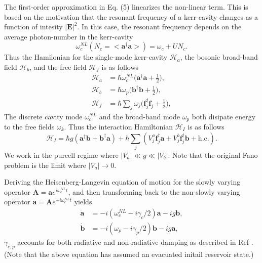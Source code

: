 \documentclass[12pt]{article}
\begin{document}
The first-order approximation in Eq. (5) linearizes the non-linear term.
This is based on the motivation that the resonant frequency of a kerr-cavity
changes as a function of intesity $|\mathbf{E}|^2$. In this case, the resonant
frequency depends on the average photon-number in the kerr-cavity
\begin{equation}
\omega_c^{NL}( N_c =<\mathbf{a}^{\dagger}\mathbf{a}> )  = \omega_c + UN_c.
\end{equation}
Thus the Hamilonian for the single-mode kerr-cavity $\mathcal{H}_a$, the 
bosonic broad-band field $\mathcal{H}_b$, and the free field $\mathcal{H}_f$
is as follows
\begin{align}
\mathcal{H}_a &= \hbar\omega_c^{NL}
    \Big( \mathbf{a}^{\dagger}\mathbf{a} + \frac{1}{2} \Big),
\\
\mathcal{H}_b &= \hbar\omega_p
    \Big( \mathbf{b}^{\dagger}\mathbf{b} + \frac{1}{2} \Big),
\\
\mathcal{H}_f &= \hbar \sum_j \omega_j
    \Big( \mathbf{f}^{\dagger}_j\mathbf{f}_j + \frac{1}{2} \Big),
\end{align}
The discrete cavity mode $\omega_c^{NL}$ and the broad-band mode $\omega_p$
both disipate energy to the free fields $\omega_k$. Thus the interaction
Hamiltonian $\mathcal{H}_{I}$ is as follows
\begin{equation}
\mathcal{H}_I = \hbar g (
    \mathbf{a}^{\dagger}\mathbf{b} + \mathbf{b}^{\dagger}\mathbf{a} )
    + \hbar \sum_j ( V_j^a \mathbf{f}^{\dagger}_j\mathbf{a} 
        + V_j^b \mathbf{f}^{\dagger}_j\mathbf{b} + \mathrm{h.c.} ).
\end{equation}
We work in the purcell regime where $|V_a| \ll g \ll |V_b|$. Note that the
original Fano problem is the limit where $|V_a| \rightarrow 0$.

Deriving the Heisenberg-Langevin equation of motion for the slowly varying
operator $\mathbf{A} = \mathbf{a}e^{i\omega_c^{NL} t}$, and then 
transforming back to the non-slowly varying operator $\mathbf{a} = 
\mathbf{A}e^{-i\omega_c^{NL} t}$ yields
\begin{align}
\dot{ \mathbf{a} } &= -i ( \omega_c^{NL} - i\gamma_c/2 )\mathbf{a} 
    - ig\mathbf{b},
\\
\dot{ \mathbf{b} } &= -i ( \omega_p - i\gamma_p/2 )\mathbf{b}
    - ig\mathbf{a},
\end{align}
$\gamma_{c,p}$ accounts for both radiative and non-radiative damping as
described in Ref \cite{thakkar2015quantum}. (Note that the above equation
has assumed an evacuated initail reservoir state.)
\end{document}
